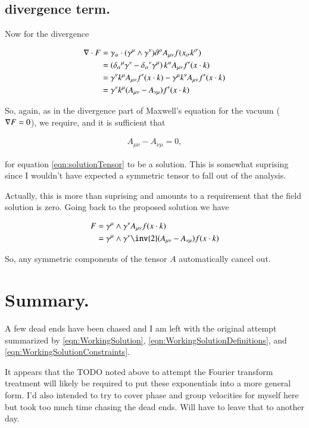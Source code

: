 \documentclass{article}
\begin{document}
\subsection{ divergence term. }

Now for the divergence 

\begin{align*}
\nabla \cdot F 
&= \gamma_\alpha \cdot (\gamma^\mu \wedge \gamma^\nu) \partial^\alpha A_{\mu\nu} f( x_\sigma k^\sigma ) \\
&= \left( {\delta_\alpha}^\mu \gamma^\nu -{\delta_\alpha}^\nu \gamma^\mu \right) k^\alpha A_{\mu\nu} f'( x \cdot k ) \\
&= 
 \gamma^\nu k^\mu A_{\mu\nu} f'( x \cdot k ) 
-\gamma^\mu k^\nu A_{\mu\nu} f'( x \cdot k ) 
\\
&= \gamma^\nu k^\mu (A_{\mu\nu} -A_{\nu\mu}) f'( x \cdot k ) 
\end{align*}

So, again, as in the divergence part of Maxwell's equation for the vacuum ($\nabla F = 0$), we require, and it is sufficient that

\begin{align*}
A_{\mu\nu} -A_{\nu\mu} = 0,
\end{align*}

for equation \ref{eqn:solutionTensor} to be a solution.  This is somewhat suprising since I wouldn't have expected a symmetric tensor to fall out of
the analysis.

Actually, this is more than suprising and amounts to a requirement that the field solution is zero.  Going back to the proposed solution we have

\begin{align*}
F 
&= \gamma^\mu \wedge \gamma^\nu A_{\mu\nu} f( x \cdot k ) \\
&= \gamma^\mu \wedge \gamma^\nu \inv{2} (A_{\mu\nu} - A_{\nu\mu})f( x \cdot k ) \\
\end{align*}

So, any symmetric components of the tensor $A$ automatically cancel out.

\section{ Summary. }

A few dead ends have been chased and I am left with the original attempt summarized by 
\ref{eqn:WorkingSolution},
\ref{eqn:WorkingSolutionDefinitions}, and
\ref{eqn:WorkingSolutionConstraints}.  

It appears that the TODO noted above to attempt the Fourier transform treatment will likely be required to put these exponentials into a more general form.
I'd also intended to try to cover phase and group velocities for myself here but took too much time chasing the dead ends.  Will have to leave that
to another day.



\end{document}
